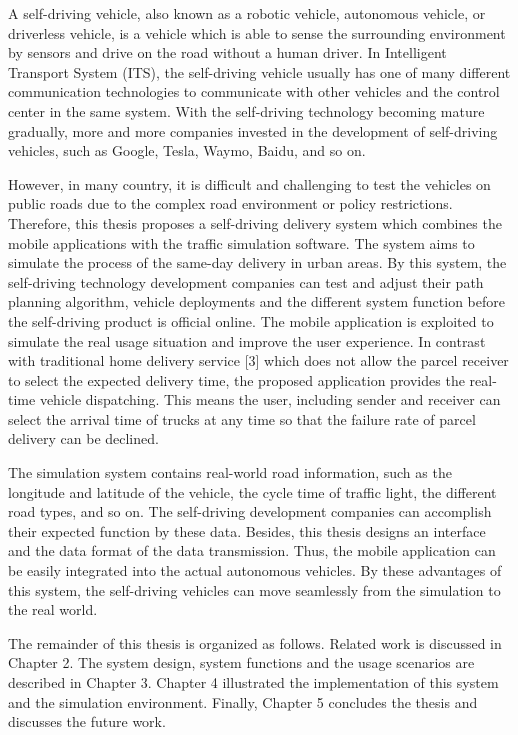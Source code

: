 \documentclass[12pt]{ksthesis}
\begin{document}
\begin{thesis}
{A self-driving vehicle, also known as a robotic vehicle, autonomous vehicle, or driverless vehicle, is a vehicle which is able to sense the surrounding environment by sensors and drive on the road without a human driver. In Intelligent Transport System (ITS), the self-driving vehicle usually has one of many different communication technologies to communicate with other vehicles and the control center in the same system. With the self-driving technology becoming mature gradually, more and more companies invested in the development of self-driving vehicles, such as Google, Tesla, Waymo, Baidu, and so on. 

However, in many country, it is difficult and challenging to test the vehicles on public roads due to the complex road environment or policy restrictions. Therefore, this thesis proposes a self-driving delivery system which combines the mobile applications with the traffic simulation software. The system aims to simulate the process of the same-day delivery in urban areas. By this system, the self-driving technology development companies can test and adjust their path planning algorithm, vehicle deployments and the different system function before the self-driving product is official online. The mobile application is exploited to simulate the real usage situation and improve the user experience. In contrast with traditional home delivery service [3] which does not allow the parcel receiver to select the expected delivery time, the proposed application provides the real-time vehicle dispatching. This means the user, including sender and receiver can select the arrival time of trucks at any time so that the failure rate of parcel delivery can be declined. 

The simulation system contains real-world road information, such as the longitude and latitude of the vehicle, the cycle time of traffic light, the different road types, and so on. The self-driving development companies can accomplish their expected function by these data. Besides, this thesis designs an interface and the data format of the data transmission. Thus, the mobile application can be easily integrated into the actual autonomous vehicles. By these advantages of this system, the self-driving vehicles can move seamlessly from the simulation to the real world. 

The remainder of this thesis is organized as follows. Related work is discussed in Chapter 2. The system design, system functions and the usage scenarios are described in Chapter 3. Chapter 4 illustrated the implementation of this system and the simulation environment. Finally, Chapter 5 concludes the thesis and discusses the future work.



}
\end{thesis}
\end{document}
